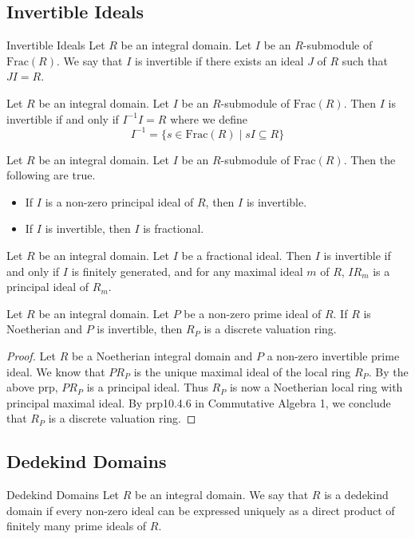 \documentclass[a4paper]{article}
\begin{document}
\subsection{Invertible Ideals}
\begin{defn}{Invertible Ideals}{} Let $R$ be an integral domain. Let $I$ be an $R$-submodule of $\text{Frac}(R)$. We say that $I$ is invertible if there exists an ideal $J$ of $R$ such that $JI=R$. 
\end{defn}

\begin{lmm}{}{} Let $R$ be an integral domain. Let $I$ be an $R$-submodule of $\text{Frac}(R)$. Then $I$ is invertible if and only if $I^{-1}I=R$ where we define $$I^{-1}=\{s\in\text{Frac}(R)\;|\;sI\subseteq R\}$$
\end{lmm}

\begin{prp}{}{} Let $R$ be an integral domain. Let $I$ be an $R$-submodule of $\text{Frac}(R)$. Then the following are true. 
\begin{itemize}
\item If $I$ is a non-zero principal ideal of $R$, then $I$ is invertible. 
\item If $I$ is invertible, then $I$ is fractional. 
\end{itemize}
\end{prp}

\begin{prp}{}{} Let $R$ be an integral domain. Let $I$ be a fractional ideal. Then $I$ is invertible if and only if $I$ is finitely generated, and for any maximal ideal $m$ of $R$, $IR_m$ is a principal ideal of $R_m$. 
\end{prp}

\begin{prp}{}{} Let $R$ be an integral domain. Let $P$ be a non-zero prime ideal of $R$. If $R$ is Noetherian and $P$ is invertible, then $R_P$ is a discrete valuation ring. \tcbline
\begin{proof}
Let $R$ be a Noetherian integral domain and $P$ a non-zero invertible prime ideal. We know that $PR_P$ is the unique maximal ideal of the local ring $R_P$. By the above prp, $PR_P$ is a principal ideal. Thus $R_P$ is now a Noetherian local ring with principal maximal ideal. By prp10.4.6 in Commutative Algebra 1, we conclude that $R_P$ is a discrete valuation ring. 
\end{proof}
\end{prp}

\subsection{Dedekind Domains}
\begin{defn}{Dedekind Domains}{} Let $R$ be an integral domain. We say that $R$ is a dedekind domain if every non-zero ideal can be expressed uniquely as a direct product of finitely many prime ideals of $R$. 
\end{defn}
\end{document}

